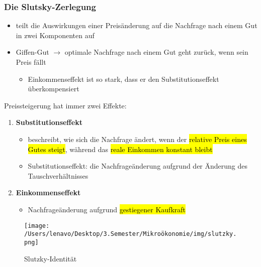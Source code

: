 \documentclass[a4paper, 10pt]{article}
\begin{document}
\subsubsection{Die Slutsky-Zerlegung}
\begin{itemize}
    \item teilt die Auswirkungen einer Preisänderung auf die Nachfrage nach einem Gut in zwei Komponenten auf
    \item Giffen-Gut $\rightarrow$ optimale Nachfrage nach einem Gut geht zurück, wenn sein Preis fällt
    \begin{itemize}
        \item Einkommenseffekt ist so stark, dass er den Substitutionseffekt überkompensiert
    \end{itemize}
\end{itemize}
Preissteigerung hat immer zwei Effekte:
\begin{enumerate}
    \item \textbf{Substitutionseffekt}
    \begin{itemize}
        \item beschreibt, wie sich die Nachfrage ändert, wenn der \hl{relative Preis eines Gutes steigt}, während das \hl{reale Einkommen konstant bleibt}
        \item Substitutionseffekt: die Nachfrageänderung aufgrund der Änderung des Tauschverhältnisses
    \end{itemize}


    \item \textbf{Einkommenseffekt}
    \begin{itemize}
        \item Nachfrageänderung aufgrund \hl{gestiegener Kaufkraft}
    \end{itemize}
\end{enumerate}
\begin{figure}[h]
    \centering
    \texttt{[image: /Users/lenavo/Desktop/3.Semester/Mikroökonomie/img/slutzky.png]}
    \caption{Slutzky-Identität}
    \label{fig:enter-label}
\end{figure}
\end{document}
